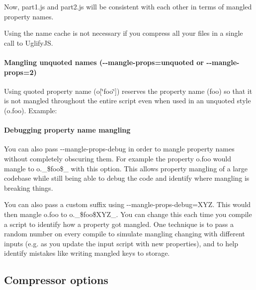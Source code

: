 Now, {\ttfamily part1.\+js} and {\ttfamily part2.\+js} will be consistent with each other in terms of mangled property names.

Using the name cache is not necessary if you compress all your files in a single call to Uglify\+JS.

\paragraph*{Mangling unquoted names ({\ttfamily -\/-\/mangle-\/props=unquoted} or {\ttfamily -\/-\/mangle-\/props=2})}

Using quoted property name ({\ttfamily o\mbox{[}\char`\"{}foo\char`\"{}\mbox{]}}) reserves the property name ({\ttfamily foo}) so that it is not mangled throughout the entire script even when used in an unquoted style ({\ttfamily o.\+foo}). Example\+:




\paragraph*{Debugging property name mangling}

You can also pass {\ttfamily -\/-\/mangle-\/props-\/debug} in order to mangle property names without completely obscuring them. For example the property {\ttfamily o.\+foo} would mangle to {\ttfamily o.\+\_\+\$foo\$\+\_\+} with this option. This allows property mangling of a large codebase while still being able to debug the code and identify where mangling is breaking things.

You can also pass a custom suffix using {\ttfamily -\/-\/mangle-\/props-\/debug=X\+YZ}. This would then mangle {\ttfamily o.\+foo} to {\ttfamily o.\+\_\+\$foo\$\+X\+Y\+Z\+\_\+}. You can change this each time you compile a script to identify how a property got mangled. One technique is to pass a random number on every compile to simulate mangling changing with different inputs (e.\+g. as you update the input script with new properties), and to help identify mistakes like writing mangled keys to storage.

\subsection*{Compressor options}

